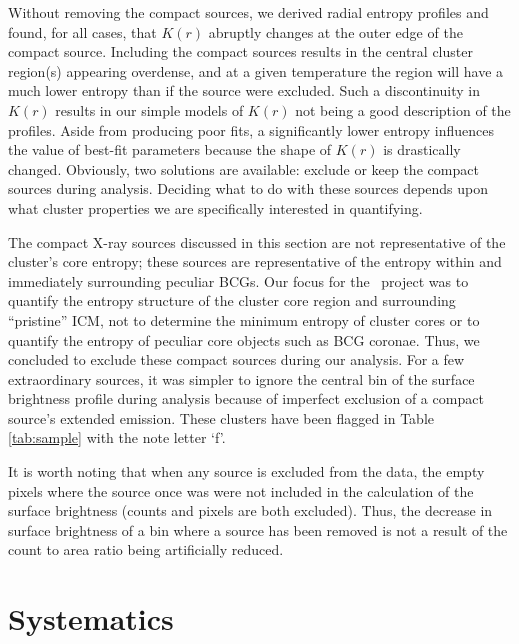 \documentclass[apj]{emulateapj}
\begin{document}
Without removing the compact sources, we derived radial entropy
profiles and found, for all cases, that $K(r)$ abruptly changes at the
outer edge of the compact source. Including the compact sources
results in the central cluster region(s) appearing overdense, and at a
given temperature the region will have a much lower entropy than if
the source were excluded. Such a discontinuity in $K(r)$ results in
our simple models of $K(r)$ not being a good description of the
profiles. Aside from producing poor fits, a significantly lower
entropy influences the value of best-fit parameters because the shape
of $K(r)$ is drastically changed. Obviously, two solutions are
available: exclude or keep the compact sources during analysis.
Deciding what to do with these sources depends upon what cluster
properties we are specifically interested in quantifying.

The compact X-ray sources discussed in this section are not
representative of the cluster's core entropy; these sources are
representative of the entropy within and immediately surrounding
peculiar BCGs. Our focus for the \accept\ project was to quantify the
entropy structure of the cluster core region and surrounding
``pristine'' ICM, not to determine the minimum entropy of cluster
cores or to quantify the entropy of peculiar core objects such as BCG
coronae. Thus, we concluded to exclude these compact sources during
our analysis. For a few extraordinary sources, it was simpler to
ignore the central bin of the surface brightness profile during
analysis because of imperfect exclusion of a compact source's extended
emission. These clusters have been flagged in Table \ref{tab:sample}
with the note letter `f'.


It is worth noting that when any source is excluded from the data, the
empty pixels where the source once was were not included in the
calculation of the surface brightness (counts and pixels are both
excluded). Thus, the decrease in surface brightness of a bin where a
source has been removed is not a result of the count to area ratio
being artificially reduced.

\section{Systematics}
\label{sec:sys}
\end{document}
